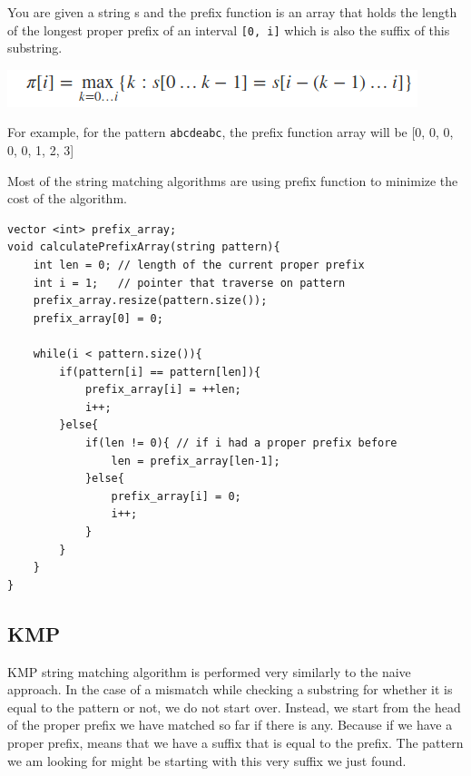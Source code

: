 \documentclass[12pt]{article}
\begin{document}
        You are given a string s and the prefix function is an array that holds the length of the longest proper prefix of an interval \texttt{[0, i]} which is also the suffix of this substring.
        
        \includegraphics[width=\linewidth/2]{proper_prefixes.png}
        
        For example, for the pattern \texttt{abcdeabc}, the prefix function array will be [0, 0, 0, 0, 0, 1, 2, 3]
        
        Most of the string matching algorithms are using prefix function to minimize the cost of the algorithm.
        
        \begin{verbatim}
vector <int> prefix_array;
void calculatePrefixArray(string pattern){
    int len = 0; // length of the current proper prefix
    int i = 1;   // pointer that traverse on pattern 
    prefix_array.resize(pattern.size());
    prefix_array[0] = 0;
    
    while(i < pattern.size()){
        if(pattern[i] == pattern[len]){
            prefix_array[i] = ++len;
            i++;
        }else{
            if(len != 0){ // if i had a proper prefix before
                len = prefix_array[len-1];
            }else{
                prefix_array[i] = 0;
                i++;
            }
        }
    }
}
        \end{verbatim}
        
        \subsection{KMP}
        KMP string matching algorithm is performed very similarly to the naive approach. In the case of a mismatch while checking a substring for whether it is equal to the pattern or not, we do not start over. Instead, we start from the head of the proper prefix we have matched so far if there is any. Because if we have a proper prefix, means that we have a suffix that is equal to the prefix. The pattern we am looking for might be starting with this very suffix we just found. 
        
\end{document}
